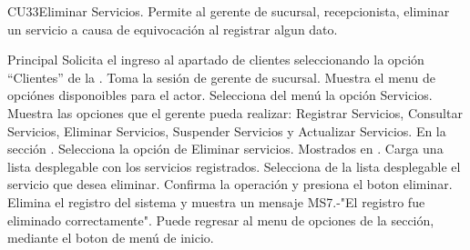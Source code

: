 



	\begin{UseCase}{CU33}{Eliminar Servicios.}{
		Permite al gerente de sucursal, recepcionista, eliminar un servicio a causa de equivocación al registrar algun dato.
	}
	\end{UseCase}

	\begin{UCtrayectoria}{Principal}
		\UCpaso[\UCactor] Solicita el ingreso al apartado de clientes seleccionando la opción ``Clientes'' de la .
		\UCpaso Toma la sesión de gerente de sucursal.
		\UCpaso Muestra el menu de opciónes disponoibles para el actor.
		\UCpaso[\UCactor] Selecciona del menú la opción Servicios.
		\UCpaso Muestra las opciones que el gerente pueda realizar: Registrar Servicios, Consultar Servicios, Eliminar Servicios, Suspender Servicios y Actualizar Servicios. En la sección .
		\UCpaso[\UCactor] Selecciona la opción de Eliminar servicios. Mostrados en .
		\UCpaso Carga una lista desplegable con los servicios registrados. 
		\UCpaso[\UCactor] Selecciona de la lista desplegable el servicio que desea eliminar.
		\UCpaso[\UCactor] Confirma la operación y presiona el boton eliminar.
		\UCpaso Elimina el registro del sistema y muestra un mensaje MS7.-"El registro fue eliminado correctamente".
		\UCpaso[\UCactor] Puede regresar al menu de opciones de la sección, mediante el boton de menú de inicio.
	\end{UCtrayectoria}

